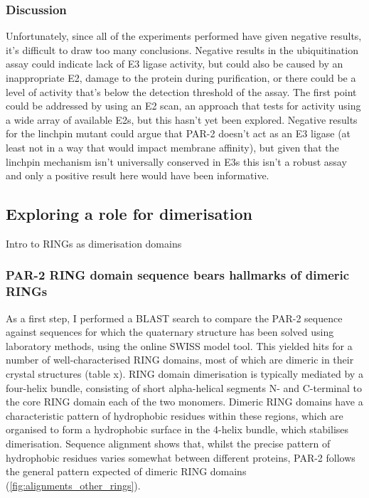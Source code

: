 \documentclass[12pt]{"article"}
\begin{document}
\subsubsection{Discussion}

Unfortunately, since all of the experiments performed have given negative results, it's difficult to draw too many conclusions. Negative results in the ubiquitination assay could indicate lack of E3 ligase activity, but could also be caused by an inappropriate E2, damage to the protein during purification, or there could be a level of activity that's below the detection threshold of the assay. The first point could be addressed by using an E2 scan, an approach that tests for activity using a wide array of available E2s, but this hasn't yet been explored. Negative results for the linchpin mutant could argue that PAR-2 doesn't act as an E3 ligase (at least not in a way that would impact membrane affinity), but given that the linchpin mechanism isn't universally conserved in E3s this isn't a robust assay and only a positive result here would have been informative.\\

\clearpage
\subsection{Exploring a role for dimerisation}

Intro to RINGs as dimerisation domains

\subsubsection{PAR-2 RING domain sequence bears hallmarks of dimeric RINGs}

As a first step, I performed a BLAST search to compare the PAR-2 sequence against sequences for which the quaternary structure has been solved using laboratory methods, using the online SWISS model tool. This yielded hits for a number of well-characterised RING domains, most of which are dimeric in their crystal structures (table x). RING domain dimerisation is typically mediated by a four-helix bundle, consisting of short alpha-helical segments N- and C-terminal to the core RING domain each of the two monomers. Dimeric RING domains have a characteristic pattern of hydrophobic residues within these regions, which are organised to form a hydrophobic surface in the 4-helix bundle, which stabilises dimerisation. Sequence alignment shows that, whilst the precise pattern of hydrophobic residues varies somewhat between different proteins, PAR-2 follows the general pattern expected of dimeric RING domains (\cref{fig:alignments_other_rings}).\\
\end{document}
